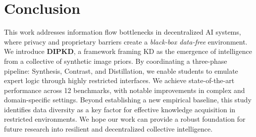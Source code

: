 \section{Conclusion} \label{sec:45-research02-conclusion}
\begin{foldable}
    This work addresses information flow bottlenecks in decentralized AI systems, where privacy and proprietary barriers create a \textit{black-box data-free} environment.
    We introduce \textbf{DIPKD}, a framework framing KD as the emergence of intelligence from a collective of synthetic image priors.
    By coordinating a three-phase pipeline: Synthesis, Contrast, and Distillation, we enable students to emulate expert logic through highly restricted interfaces.
    We achieve state-of-the-art performance across 12 benchmarks, with notable improvements in complex and domain-specific settings.
    Beyond establishing a new empirical baseline, this study identifies data diversity as a key factor for effective knowledge acquisition in restricted environments.
    We hope our work can provide a robust foundation for future research into resilient and decentralized collective intelligence.
\end{foldable}
